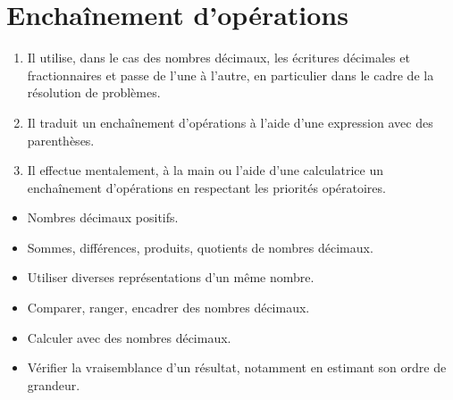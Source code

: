 \documentclass[nocrop]{sesamanuel_college_5e_new}
\begin{document}
\themaN
\chapter{Enchaînement d'opérations}
\label{S01}




\begin{autoeval}
   \small
   \begin{enumerate}
      \item Il utilise, dans le cas des nombres décimaux, les écritures décimales et fractionnaires et passe de l’une à l’autre, en particulier dans le cadre de la résolution de problèmes.
      \item Il traduit un enchaînement d’opérations à l’aide d’une expression avec des parenthèses.
      \item Il effectue mentalement, à la main ou l’aide d’une calculatrice un enchaînement d’opérations en respectant les priorités opératoires.
   \end{enumerate}
\end{autoeval}


\begin{prerequis}
   \small
   \begin{itemize}
      \item Nombres décimaux positifs.
      \item Sommes, différences, produits, quotients de nombres décimaux.
      \item Utiliser diverses représentations d'un même nombre.
      \item[\com] Comparer, ranger, encadrer des nombres décimaux.
      \item[\com] Calculer avec des nombres décimaux.
      \item[\com] Vérifier la vraisemblance d'un résultat, notamment en estimant son ordre de grandeur.
   \end{itemize}
\end{prerequis}

\vfill
\end{document}
